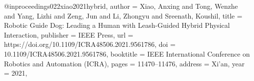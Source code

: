 @inproceedings{022xiao2021hybrid,
author = {Xiao, Anxing and Tong, Wenzhe and Yang, Lizhi and Zeng, Jun and Li, Zhongyu and Sreenath, Koushil},
title = {Robotic Guide Dog: Leading a Human with Leash-Guided Hybrid Physical Interaction},
publisher = {IEEE Press},
url = {https://doi.org/10.1109/ICRA48506.2021.9561786},
doi = {10.1109/ICRA48506.2021.9561786},
booktitle = {IEEE International Conference on Robotics and Automation (ICRA)},
pages = {11470–11476},
address = {Xi'an},
year = {2021},
}